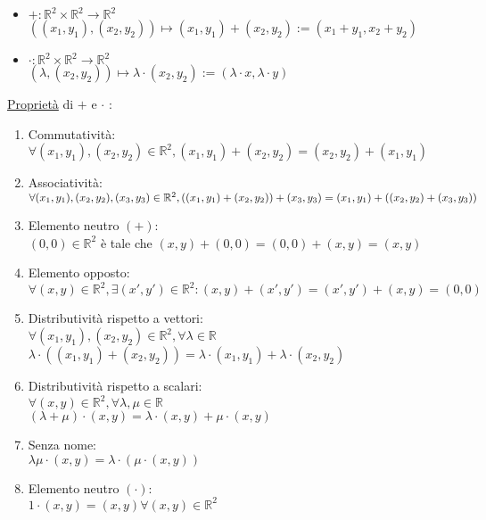 \documentclass{article}
\newcommand{\ul}[1]{\underline{#1}}
\newcommand{\R}{\mathbb{R}}
\begin{document}
\begin{itemize}
	\item $+: \R^2\times\R^2\rightarrow\R^2$\\$((x_1,y_1),(x_2,y_2))\mapsto(x_1,y_1)+(x_2,y_2):=(x_1+y_1,x_2+y_2)$
	\item $\cdot: \R^2\times\R^2\rightarrow\R^2$\\\hspace*{-0.3em}$(\lambda,(x_2,y_2))\mapsto\lambda\cdot(x_2,y_2):=(\lambda\cdot x,\lambda\cdot y)$
\end{itemize}
\ul{Proprietà} di $+$ e $\cdot$ :
\begin{enumerate}
	\item Commutatività:\\$\forall(x_1,y_1),(x_2,y_2)\in\R^2, (x_1,y_1)+(x_2,y_2)=(x_2,y_2)+(x_1,y_1)$
	\item Associatività:\\$\forall(x_1,y_1),(x_2,y_2),(x_3,y_3)\in\R^2,\\((x_1,y_1)+(x_2,y_2))+(x_3,y_3)=(x_1,y_1)+((x_2,y_2)+(x_3,y_3))$
	\item Elemento neutro $(+)$:\\$(0,0)\in\R^2$ è tale che $(x,y)+(0,0)=(0,0)+(x,y)=(x,y)$
	\item Elemento opposto:\\$\forall(x,y)\in\R^2,\exists(x',y')\in\R^2:(x,y)+(x',y')=(x',y')+(x,y)=(0,0)$
	\item Distributività rispetto a vettori:\\$\forall(x_1,y_1),(x_2,y_2)\in\R^2,\forall\lambda\in\R$\\$\lambda\cdot((x_1,y_1)+(x_2,y_2))=\lambda\cdot(x_1,y_1)+\lambda\cdot(x_2,y_2)$
	\item Distributività rispetto a scalari:\\$\forall(x,y)\in\R^2,\forall\lambda,\mu\in\R$\\$(\lambda+\mu)\cdot(x,y)=\lambda\cdot(x,y)+\mu\cdot(x,y)$
	\item Senza nome:\\$\lambda\mu\cdot(x,y)=\lambda\cdot(\mu\cdot(x,y))$
	\item Elemento neutro $(\cdot)$:\\$1\cdot(x,y)=(x,y)\forall(x,y)\in\R^2$
\end{enumerate}
\end{document}
